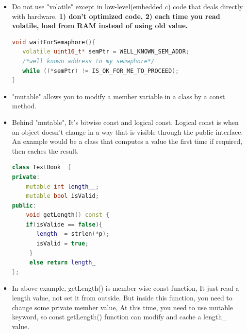 \documentclass[a4paper,12pt,twoside]{book}
\begin{document}
\begin{itemize}
\begin{enumerate}
\end{enumerate}

\item Do not use "volatile" except in low-level(embedded c) code that deals directly with hardware. \textbf{1) don't optimized code, 2) each time you read volatile, load from RAM instead of using old value.}
\begin{lstlisting}[frame=single, language=c++]
void waitForSemaphore(){
   volatile uint16_t* semPtr = WELL_KNOWN_SEM_ADDR;
   /*well known address to my semaphore*/
   while ((*semPtr) != IS_OK_FOR_ME_TO_PROCEED);
}
\end{lstlisting}

\item "mutable" allows you to modify a member variable in a class by a const method.

\item Behind "mutable", It's bitwise const and logical const. Logical const is when an object doesn't change in a way that is visible through the public interface. An example would be a class that computes a value the first time if required, then caches the result.
\begin{lstlisting}[frame=single, language=c++]
class TextBook  {
private:
    mutable int length__;
    mutable bool isValid;
public:
    void getLength() const {
    if(isValide == false){
       length_ = strlen(*p);
       isValid = true; 
     }
     else return length_
};
\end{lstlisting}

\item In above example, getLength() is member-wise const function, It just read a length value, not set it from outside. But inside this function, you need to change some private member value, At this time, you need to use mutable keyword, so const getLength() function can modify and cache a length\_ value.

\end{itemize}
\end{document}
